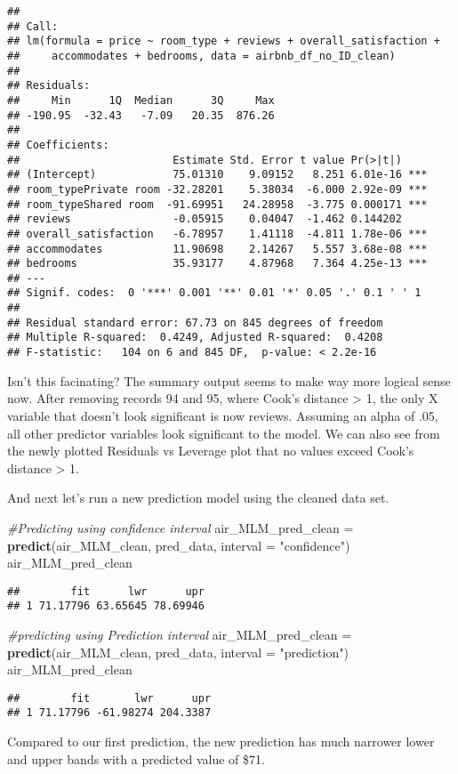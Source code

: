 \documentclass[]{article}
\newenvironment{Shaded}{\begin{snugshade}}{\end{snugshade}}
\newcommand{\CommentTok}[1]{\textcolor[rgb]{0.56,0.35,0.01}{\textit{#1}}}
\newcommand{\DataTypeTok}[1]{\textcolor[rgb]{0.13,0.29,0.53}{#1}}
\newcommand{\KeywordTok}[1]{\textcolor[rgb]{0.13,0.29,0.53}{\textbf{#1}}}
\newcommand{\NormalTok}[1]{#1}
\newcommand{\StringTok}[1]{\textcolor[rgb]{0.31,0.60,0.02}{#1}}
\begin{document}
\begin{verbatim}
## 
## Call:
## lm(formula = price ~ room_type + reviews + overall_satisfaction + 
##     accommodates + bedrooms, data = airbnb_df_no_ID_clean)
## 
## Residuals:
##     Min      1Q  Median      3Q     Max 
## -190.95  -32.43   -7.09   20.35  876.26 
## 
## Coefficients:
##                        Estimate Std. Error t value Pr(>|t|)    
## (Intercept)            75.01310    9.09152   8.251 6.01e-16 ***
## room_typePrivate room -32.28201    5.38034  -6.000 2.92e-09 ***
## room_typeShared room  -91.69951   24.28958  -3.775 0.000171 ***
## reviews                -0.05915    0.04047  -1.462 0.144202    
## overall_satisfaction   -6.78957    1.41118  -4.811 1.78e-06 ***
## accommodates           11.90698    2.14267   5.557 3.68e-08 ***
## bedrooms               35.93177    4.87968   7.364 4.25e-13 ***
## ---
## Signif. codes:  0 '***' 0.001 '**' 0.01 '*' 0.05 '.' 0.1 ' ' 1
## 
## Residual standard error: 67.73 on 845 degrees of freedom
## Multiple R-squared:  0.4249, Adjusted R-squared:  0.4208 
## F-statistic:   104 on 6 and 845 DF,  p-value: < 2.2e-16
\end{verbatim}

Isn't this facinating? The summary output seems to make way more logical
sense now. After removing records 94 and 95, where Cook's distance
\textgreater{} 1, the only X variable that doesn't look significant is
now reviews. Assuming an alpha of .05, all other predictor variables
look significant to the model. We can also see from the newly plotted
Residuals vs Leverage plot that no values exceed Cook's distance
\textgreater{} 1.

And next let's run a new prediction model using the cleaned data set.

\begin{Shaded}
\begin{Highlighting}[]
\CommentTok{#Predicting using confidence interval}
\NormalTok{air_MLM_pred_clean =}\StringTok{ }\KeywordTok{predict}\NormalTok{(air_MLM_clean, pred_data, }\DataTypeTok{interval =} \StringTok{"confidence"}\NormalTok{)}
\NormalTok{air_MLM_pred_clean}
\end{Highlighting}
\end{Shaded}

\begin{verbatim}
##        fit      lwr      upr
## 1 71.17796 63.65645 78.69946
\end{verbatim}

\begin{Shaded}
\begin{Highlighting}[]
\CommentTok{#predicting using Prediction interval}
\NormalTok{air_MLM_pred_clean =}\StringTok{ }\KeywordTok{predict}\NormalTok{(air_MLM_clean, pred_data, }\DataTypeTok{interval =} \StringTok{"prediction"}\NormalTok{)}
\NormalTok{air_MLM_pred_clean}
\end{Highlighting}
\end{Shaded}

\begin{verbatim}
##        fit       lwr      upr
## 1 71.17796 -61.98274 204.3387
\end{verbatim}

Compared to our first prediction, the new prediction has much narrower
lower and upper bands with a predicted value of \$71.
\end{document}
